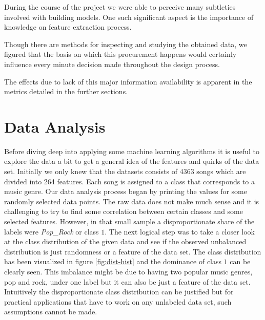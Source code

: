 \documentclass[fleqn,10pt]{SelfArx} %
\begin{document}
During the course of the project we were able to perceive many subtleties involved with building models. One such significant aspect is the importance of knowledge on feature extraction process.

Though there are methods for inspecting and studying the obtained data, we figured that the basis on which this procurement happens would certainly influence every minute decision made throughout the design process.

The effects due to lack of this major information availability is apparent in the metrics detailed in the further sections.


\section{Data Analysis}

Before diving deep into applying some machine learning algorithms it is useful
to explore the data a bit to get a general idea of the features and quirks of
the data set. Initially we only knew that the datasets consists of 4363 songs
which are divided into 264 features. Each song is assigned to a class that
corresponds to a music genre. Our data analysis process began by printing the
values for some randomly selected data points. The raw data does not make much
sense and it is challenging to try to find some correlation between certain
classes and some selected features. However, in that small sample a
disproportionate share of the labels were \textit{Pop\_Rock} or class $1$. The
next logical step was to take a closer look at the class distribution of the
given data and see if the observed unbalanced distribution is just randomness or
a feature of the data set. The class distribution has been visualized in figure
\ref{fig:dist-hist} and the dominance of class $1$ can be clearly seen. This
imbalance might be due to having two popular music genres, pop and rock, under
one label but it can also be just a feature of the data set. Intuitively the
disproportionate class distribution can be justified but for practical
applications that have to work on any unlabeled data set, such assumptions
cannot be made.
\end{document}
